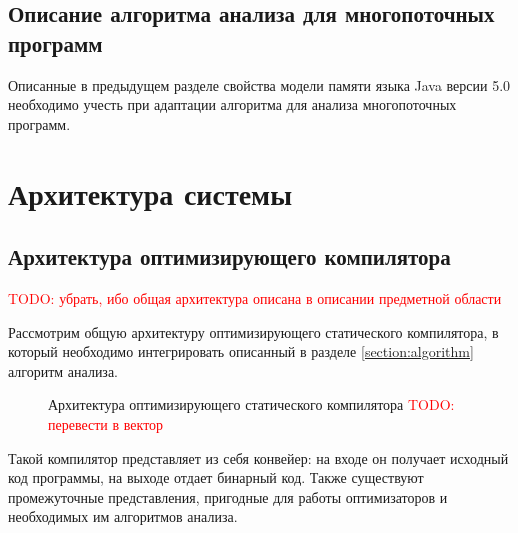 \documentclass[14pt,titlepage]{extarticle}
\newcommand{\todo}[1]{\textcolor{red}{TODO: #1}}
\let\oldsection\section
\renewcommand{\section}{\newpage\oldsection}
\begin{document}
    \subsection{Описание алгоритма анализа для многопоточных программ}

      Описанные в предыдущем разделе свойства модели памяти языка Java версии
      5.0 необходимо учесть при адаптации алгоритма для анализа многопоточных
      программ.

  \section{Архитектура системы}

    \subsection{Архитектура оптимизирующего компилятора}

      \todo{убрать, ибо общая архитектура описана в описании предметной
      области}

      Рассмотрим общую архитектуру оптимизирующего статического компилятора,
      в который необходимо интегрировать описанный в разделе
      \ref{section:algorithm} алгоритм анализа.

      \begin{figure}[!htb]
        \caption{Архитектура оптимизирующего статического компилятора
                 \todo{перевести в вектор}}
        \label{fig:arch2}
      \end{figure}

      Такой компилятор представляет из себя конвейер: на входе он получает
      исходный код программы, на выходе отдает бинарный код. Также существуют
      промежуточные представления, пригодные для работы оптимизаторов и
      необходимых им алгоритмов анализа.
\end{document}
